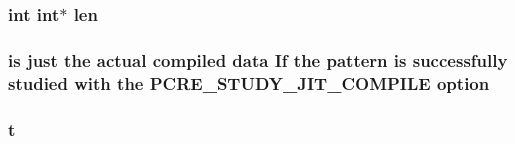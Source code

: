 \subsubsection[{\texorpdfstring{len}{len}}]{ {\bf int} {\bf int}$\ast$ len}\hypertarget{group__APACHE__CORE__TIME_gaf3fc1ce4e2ee79aa8af6cabf3f3340ef}{}\label{group__APACHE__CORE__TIME_gaf3fc1ce4e2ee79aa8af6cabf3f3340ef}
\subsubsection[{\texorpdfstring{option}{option}}]{ {\bf is} just the actual {\bf compiled} {\bf data} If the {\bf pattern} {\bf is} successfully {\bf studied} {\bf with} the {\bf P\+C\+R\+E\+\_\+\+S\+T\+U\+D\+Y\+\_\+\+J\+I\+T\+\_\+\+C\+O\+M\+P\+I\+LE} option}\hypertarget{group__APACHE__CORE__TIME_ga737bdf2e23a8aca3ce89e79e9df35b3e}{}\label{group__APACHE__CORE__TIME_ga737bdf2e23a8aca3ce89e79e9df35b3e}
\subsubsection[{\texorpdfstring{t}{t}}]{ t}\hypertarget{group__APACHE__CORE__TIME_gabfa74bb4f05f3b2de1a89160025e5400}{}\label{group__APACHE__CORE__TIME_gabfa74bb4f05f3b2de1a89160025e5400}
